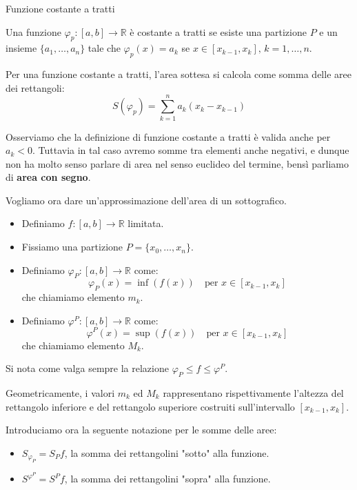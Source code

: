 \documentclass[12pt]{report}
\newcommand{\R}{\mathbb{R}}
\begin{document}
	\begin{definizione}{Funzione costante a tratti}{}
		
		Una funzione $\varphi_p: [a, b] \to \R$ è costante a tratti se esiste una partizione $P$ e un insieme $\{a_1, \dots, a_n\}$ tale che $\varphi_p(x) = a_k$ se $x \in [x_{k-1}, x_k], \, k = 1, \dots, n$.
		
	\end{definizione}
	
	Per una funzione costante a tratti, l'area sottesa si calcola come somma delle aree dei rettangoli:
	\[
	S(\varphi_p) = \sum_{k=1}^n a_k (x_k - x_{k-1})
	\]
	
	Osserviamo che la definizione di funzione costante a tratti è valida anche per $a_k < 0$. Tuttavia in tal caso avremo somme tra elementi anche negativi, e dunque non ha molto senso parlare di area nel senso euclideo del termine, bensì parliamo di \textbf{area con segno}.
	
	Vogliamo ora dare un'approssimazione dell'area di un sottografico.
	\begin{itemize}
		
		\item Definiamo $f: [a, b] \to \mathbb{R}$ limitata.
		
		\item Fissiamo una partizione $P = \{x_0, \dots, x_n\}$.
		
		\item Definiamo $\varphi_P: [a, b] \to \mathbb{R}$ come:
		\[
		\varphi_P(x) = \inf(f(x)) \quad \text{per } x \in [x_{k-1}, x_k]
		\]
		che chiamiamo elemento $m_k$.
		
		\item Definiamo $\varphi^P: [a, b] \to \mathbb{R}$ come:
		\[
		\varphi^P(x) = \sup(f(x)) \quad \text{per } x \in [x_{k-1}, x_k]
		\]
		che chiamiamo elemento $M_k$.
		
	\end{itemize}
	
	Si nota come valga sempre la relazione $\varphi_P \le f \le \varphi^P$.
	
	\begin{osservazione}{}{}
		
		Geometricamente, i valori $m_k$ ed $M_k$ rappresentano rispettivamente l'altezza del rettangolo inferiore e del rettangolo superiore costruiti sull'intervallo $[x_{k-1}, x_k]$.
		
	\end{osservazione}
	
	Introduciamo ora la seguente notazione per le somme delle aree:
	\begin{itemize}
		
		\item $S_{\varphi_P} = S_P f$, la somma dei rettangolini "sotto" alla funzione.
		
		\item $S^{\varphi^P} = S^P f$, la somma dei rettangolini "sopra" alla funzione.
		
	\end{itemize}
	
\end{document}
